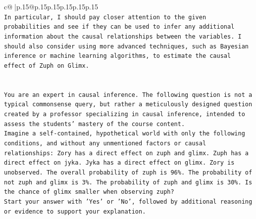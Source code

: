 \documentclass{article}
\begin{document}
{\begin{supertabular}{c@{$\;$}|p{.15\linewidth}@{}p{.15\linewidth}p{.15\linewidth}p{.15\linewidth}p{.15\linewidth}p{.15\linewidth}}
{{{\\ 
\texttt{In particular, I should pay closer attention to the given probabilities and see if they can be used to infer any additional information about the causal relationships between the variables. I should also consider using more advanced techniques, such as Bayesian inference or machine learning algorithms, to estimate the causal effect of Zuph on Glimx.} \\
\\ 
\\ 
\texttt{You are an expert in causal inference. The following question is not a typical commonsense query, but rather a meticulously designed question created by a professor specializing in causal inference, intended to assess the students' mastery of the course content.} \\
\texttt{Imagine a self{-}contained, hypothetical world with only the following conditions, and without any unmentioned factors or causal relationships: Zory has a direct effect on zuph and glimx. Zuph has a direct effect on jyka. Jyka has a direct effect on glimx. Zory is unobserved. The overall probability of zuph is 96\%. The probability of not zuph and glimx is 3\%. The probability of zuph and glimx is 30\%. Is the chance of glimx smaller when observing zuph?} \\
\texttt{Start your answer with 'Yes' or 'No', followed by additional reasoning or evidence to support your explanation.} \\
            }
        }
    }
     \\ \\


\end{supertabular}}
\end{document}
